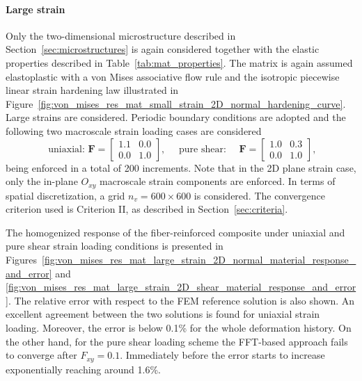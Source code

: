 \FloatBarrier

\paragraph{Large strain}

Only the two-dimensional microstructure described in Section~\ref{sec:microstructures} is again considered together with the elastic properties described in Table~\ref{tab:mat_properties}.
The matrix is again assumed elastoplastic with a von Mises associative flow rule and the isotropic piecewise linear strain hardening law illustrated in Figure~\ref{fig:von_mises_res_mat_small_strain_2D_normal_hardening_curve}.
Large strains are considered.
Periodic boundary conditions are adopted and the following two macroscale strain loading cases are considered
\begin{equation}
\text { uniaxial: } \bm{F}=\left[\begin{array}{cc}
1.1 & 0.0 \\
0.0 & 1.0
\end{array}\right], \quad \text { pure shear: } \quad \bm F=\left[\begin{array}{cc}
1.0 & 0.3 \\
0.0 & 1.0
\end{array}\right],
\end{equation}
being enforced in a total of 200 increments.
Note that in the 2D plane strain case, only the in-plane \(O_{x y}\) macroscale strain components are enforced.
In terms of spatial discretization, a grid \(n_{v}=600 \times 600\) is considered.
The convergence criterion used is Criterion II, as described in Section~\ref{sec:criteria}.

The homogenized response of the fiber-reinforced composite under uniaxial and pure shear strain loading conditions is presented in Figures~\ref{fig:von_mises_res_mat_large_strain_2D_normal_material_response_and_error} and \ref{fig:von_mises_res_mat_large_strain_2D_shear_material_response_and_error}.
The relative error with respect to the FEM reference solution is also shown.
An excellent agreement between the two solutions is found for uniaxial strain loading.
Moreover, the error is below 0.1\% for the whole deformation history.
On the other hand, for the pure shear loading scheme the FFT-based approach fails to converge after \(F_{xy}=0.1\).
Immediately before the error starts to increase exponentially reaching around 1.6\%.

